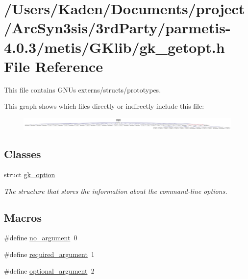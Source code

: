 \hypertarget{a00050}{}\section{/\+Users/\+Kaden/\+Documents/project/\+Arc\+Syn3sis/3rd\+Party/parmetis-\/4.0.3/metis/\+G\+Klib/gk\+\_\+getopt.h File Reference}
\label{a00050}


This file contains G\+NU\textquotesingle{}s externs/structs/prototypes.  


This graph shows which files directly or indirectly include this file\+:\nopagebreak
\begin{figure}[H]
\begin{center}
\leavevmode
\includegraphics[width=350pt]{a00052}
\end{center}
\end{figure}
\subsection*{Classes}
\begin{DoxyCompactItemize}
\item 
struct \hyperlink{a00630}{gk\+\_\+option}
\begin{DoxyCompactList}\small\item\em The structure that stores the information about the command-\/line options. \end{DoxyCompactList}\end{DoxyCompactItemize}
\subsection*{Macros}
\begin{DoxyCompactItemize}
\item 
\#define \hyperlink{a00050_a3bc1d5f667b5b4ca4b4abb685dc874ce}{no\+\_\+argument}~0
\item 
\#define \hyperlink{a00050_a6ece8d8dfa8378778f7290fdaba5b8bc}{required\+\_\+argument}~1
\item 
\#define \hyperlink{a00050_acca06c0a947656bd8b395bf1084ffb72}{optional\+\_\+argument}~2
\end{DoxyCompactItemize}
